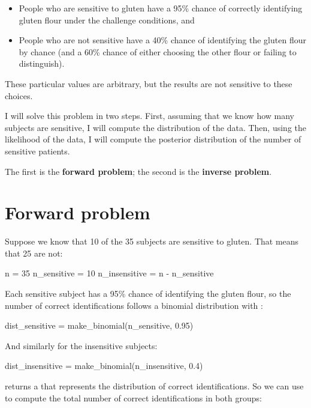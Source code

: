\documentclass[12pt]{book}
\theoremstyle{exercise}
\begin{document}
\begin{itemize}

\item People who are sensitive to gluten have a 95\% chance of correctly identifying gluten flour under the challenge conditions, and 

\item People who are not sensitive have a 40\% chance of identifying the gluten flour by chance (and a 60\% chance of either choosing the other flour or failing to distinguish).

\end{itemize}

These particular values are arbitrary, but the results are not sensitive to these choices.

I will solve this problem in two steps.  First, assuming that we know how many subjects are sensitive, I will compute the distribution of the data.  Then, using the likelihood of the data, I will compute the posterior distribution of the number of sensitive patients.

The first is the {\bf forward problem}; the second is the {\bf inverse problem}.


\section{Forward problem}

Suppose we know that 10 of the 35 subjects are sensitive to gluten.  That means that 25 are not:

\begin{code}
n = 35
n_sensitive = 10
n_insensitive = n - n_sensitive
\end{code}

Each sensitive subject has a 95\% chance of identifying the gluten flour, so the number of correct identifications follows a binomial distribution with :

\begin{code}
dist_sensitive = make_binomial(n_sensitive, 0.95)
\end{code}

And similarly for the insensitive subjects:

\begin{code}
dist_insensitive = make_binomial(n_insensitive, 0.4)
\end{code}

 returns a  that represents the distribution of correct identifications.
So we can use  to compute the total number of correct identifications in both groups:
\end{document}
